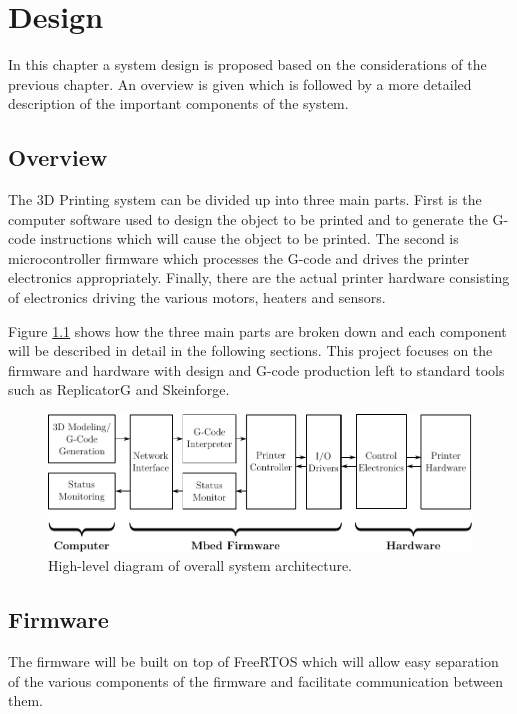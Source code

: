 \chapter{Design}
	
	In this chapter a system design is proposed based on the considerations of the
	previous chapter. An overview is given which is followed by a more detailed
	description of the important components of the system.
	
	\section{Overview}
		
		The 3D Printing system can be divided up into three main parts. First is the
		computer software used to design the object to be printed and to generate
		the G-code instructions which will cause the object to be printed. The
		second is microcontroller firmware which processes the G-code and drives the
		printer electronics appropriately. Finally, there are the actual printer
		hardware consisting of electronics driving the various motors, heaters and
		sensors.
		
		Figure \ref{fig:systemDiagramTop} shows how the three main parts are broken
		down and each component will be described in detail in the following
		sections. This project focuses on the firmware and hardware with design and
		G-code production left to standard tools such as ReplicatorG and Skeinforge.
		
		\begin{figure}
			\includegraphics[width=1\textwidth]{diagrams/systemDiagramTop.pdf}
			\caption{High-level diagram of overall system architecture.}
			\label{fig:systemDiagramTop}
		\end{figure}
	
	\section{Firmware}
		
		The firmware will be built on top of FreeRTOS which will allow easy
		separation of the various components of the firmware and facilitate
		communication between them.
		
